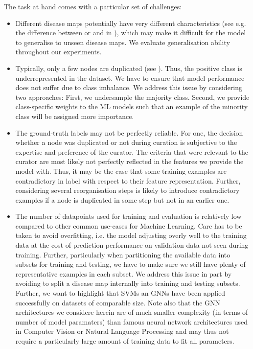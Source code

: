 \documentclass[
	fontsize=10pt, %
	twoside=false, %
	secnumdepth=1, %
  toc=indentunnumbered %
]{kaobook}
\begin{document}
The task at hand comes with a particular set of challenges:
\begin{itemize}
\item Different disease maps potentially have very different characteristics
  (see e.g. the difference between \ADMap or \PDMap and \ReconMap in
  ), which may make it difficult for the model to
  generalise to unseen disease maps. We evaluate generalisation ability
  throughout our experiments.
\item Typically, only a few nodes are duplicated (see ).
  Thus, the positive class is underrepresented in the dataset. We have to ensure that
  model performance does not suffer due to class imbalance. We address this
  issue by considering two approaches: First, we undersample the majority class.
  Second, we provide class-specific weights to the ML models such that an
  example of the minority class will be assigned more importance.
\item The ground-truth labels may not be perfectly reliable.
  For one, the decision whether a node was duplicated or not during curation is
  subjective to the expertise and preference of the curator. The criteria that
  were relevant to the curator are most likely not perfectly reflected in the
  features we provide the model with.
  Thus, it may be the case that some
  training examples are contradictory in label with respect to their feature
  representation. Further, considering several reorganisation steps is likely to
  introduce contradictory examples if a node is duplicated in some step but not
  in an earlier one.
\item The number of datapoints used for training and evaluation is relatively
  low compared to other common use-cases for Machine Learning. Care has to be
  taken to avoid overfitting, i.e. the model adjusting overly well to the training
  data at the cost of prediction performance on validation data not seen during
  training. Further, particularly when partitioning the available data into
  subsets for training and testing, we have to make sure we still have plenty of
  representative examples in each subset. We address this issue in part by avoiding to
  split a disease map internally into training and testing subsets. Further, we
  want to highlight that SVMs an GNNs have been applied successfully on datasets
  of comparable size.
  Note also that the GNN architectures we considere herein are of
  much smaller complexity (in terms of number of model paramaters) than famous
  neural network architectures used in Computer Vision or Natural Language
  Processing
  and may thus not require a particularly large amount of training
  data to fit all parameters.
\end{itemize}
\end{document}
